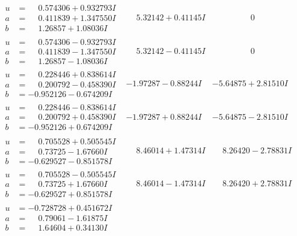 \documentclass[1p]{elsarticle_modified}
\theoremstyle{definition}
\begin{document}
$$\begin{array}{c|c|c}
\begin{aligned}
u &= \phantom{-}0.574306 + 0.932793 I \\
a &= \phantom{-}0.411839 + 1.347550 I \\
b &= \phantom{-}1.26857 + 1.08036 I\end{aligned}
 & \phantom{-}5.32142 + 0.41145 I & \phantom{-0.000000 } 0 \\ \hline\begin{aligned}
u &= \phantom{-}0.574306 - 0.932793 I \\
a &= \phantom{-}0.411839 - 1.347550 I \\
b &= \phantom{-}1.26857 - 1.08036 I\end{aligned}
 & \phantom{-}5.32142 - 0.41145 I & \phantom{-0.000000 } 0 \\ \hline\begin{aligned}
u &= \phantom{-}0.228446 + 0.838614 I \\
a &= \phantom{-}0.200792 - 0.458390 I \\
b &= -0.952126 - 0.674209 I\end{aligned}
 & -1.97287 - 0.88244 I & -5.64875 + 2.81510 I \\ \hline\begin{aligned}
u &= \phantom{-}0.228446 - 0.838614 I \\
a &= \phantom{-}0.200792 + 0.458390 I \\
b &= -0.952126 + 0.674209 I\end{aligned}
 & -1.97287 + 0.88244 I & -5.64875 - 2.81510 I \\ \hline\begin{aligned}
u &= \phantom{-}0.705528 + 0.505545 I \\
a &= \phantom{-}0.73725 - 1.67660 I \\
b &= -0.629527 - 0.851578 I\end{aligned}
 & \phantom{-}8.46014 + 1.47314 I & \phantom{-}8.26420 - 2.78831 I \\ \hline\begin{aligned}
u &= \phantom{-}0.705528 - 0.505545 I \\
a &= \phantom{-}0.73725 + 1.67660 I \\
b &= -0.629527 + 0.851578 I\end{aligned}
 & \phantom{-}8.46014 - 1.47314 I & \phantom{-}8.26420 + 2.78831 I \\ \hline\begin{aligned}
u &= -0.728728 + 0.451672 I \\
a &= \phantom{-}0.79061 - 1.61875 I \\
b &= \phantom{-}1.64604 + 0.34130 I\end{aligned}

\end{array}$$
\end{document}
